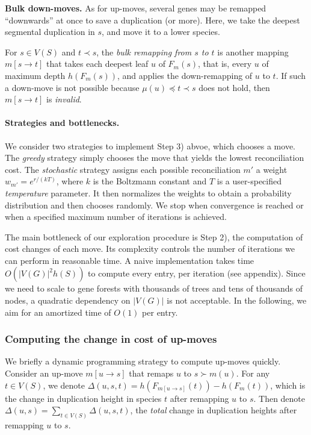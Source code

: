 \documentclass[10pt]{article}
\begin{document}
\medskip 

\noindent
\textbf{Bulk down-moves.} As for up-moves, several genes may be remapped ``downwards'' at once to save a duplication (or more).  Here, we take the deepest segmental duplication in $s$, and move it to a lower species.

For $s \in V(S)$ and $t \prec s$, the \emph{bulk remapping from $s$ to $t$} is another mapping $m[s \rightarrow t]$ that takes each deepest leaf $u$ of $F_m(s)$, that is, every $u$ of maximum depth $h(F_m(s))$, and applies the down-remapping of $u$ to $t$.  If such a down-move is not possible because $\mu(u) \preceq t \prec s$ does not hold, then $m[s \rightarrow t]$ is \emph{invalid}.  

\paragraph{Strategies and bottlenecks.}
We consider two strategies to implement Step 3) abvoe, which chooses a move.  
The \emph{greedy} strategy simply chooses the move that yields the lowest reconciliation cost.  The \emph{stochastic} strategy assigns each possible reconciliation $m'$ a weight $w_{m'} = e^{r / (kT)}$, where $k$ is the Boltzmann constant and $T$ is a user-specified \emph{temperature} parameter.  It then normalizes the weights to obtain a probability distribution and then chooses randomly.  We stop when convergence is reached or when a specified maximum number of iterations is achieved.


The main bottleneck of our exploration procedure is Step 2), the computation of cost changes of each move.  Its complexity controls the number of iterations we can perform in reasonable time.  
A naive implementation takes time $O(|V(G)|^2 h(S))$ to compute every entry, per iteration (see appendix).   
Since we need to scale to gene forests with thousands of trees and tens of thousands of nodes, a quadratic dependency on $|V(G)|$ is not acceptable.  In the following, we aim for an amortized time of $O(1)$ per entry.

\subsubsection*{Computing the change in cost of up-moves}

We briefly a dynamic programming strategy to compute up-moves quickly.    
Consider an up-move $m[u \rightarrow s]$ that remaps $u$ to $s \succ m(u)$. 
For any $t \in V(S)$, 
we denote $\Delta(u, s, t) = h(F_{m[u \rightarrow s]}(t)) - h(F_m(t))$, which is the change in duplication height in species $t$ after remapping $u$ to $s$. 
Then denote
$\Delta(u, s) = \sum_{t \in V(S)} \Delta(u, s, t)$, the \emph{total} change in duplication heights after remapping $u$ to $s$. 
\end{document}
